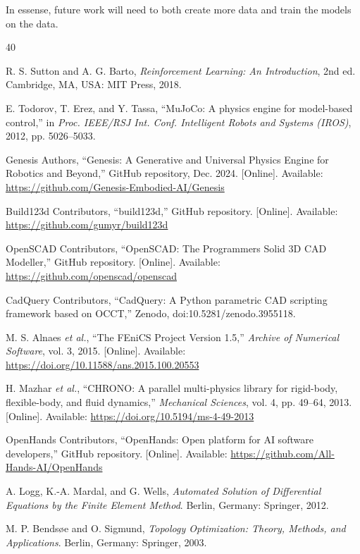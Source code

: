 \documentclass[conference]{IEEEtran}
\begin{document}
In essense, future work will need to both create more data and train the models on the data.
\begin{thebibliography}{40}

R. S. Sutton and A. G. Barto, \emph{Reinforcement Learning: An Introduction}, 2nd ed. Cambridge, MA, USA: MIT Press, 2018.

E. Todorov, T. Erez, and Y. Tassa, ``MuJoCo: A physics engine for model-based control,'' in \emph{Proc. IEEE/RSJ Int. Conf. Intelligent Robots and Systems (IROS)}, 2012, pp. 5026--5033.

Genesis Authors, ``Genesis: A Generative and Universal Physics Engine for Robotics and Beyond,'' GitHub repository, Dec. 2024. [Online]. Available: \url{https://github.com/Genesis-Embodied-AI/Genesis}

Build123d Contributors, ``build123d,'' GitHub repository. [Online]. Available: \url{https://github.com/gumyr/build123d}

OpenSCAD Contributors, ``OpenSCAD: The Programmers Solid 3D CAD Modeller,'' GitHub repository. [Online]. Available: \url{https://github.com/openscad/openscad}

CadQuery Contributors, ``CadQuery: A Python parametric CAD scripting framework based on OCCT,'' Zenodo, doi:10.5281/zenodo.3955118.

M. S. Alnaes \emph{et al.}, ``The FEniCS Project Version 1.5,'' \emph{Archive of Numerical Software}, vol. 3, 2015. [Online]. Available: \url{https://doi.org/10.11588/ans.2015.100.20553}

H. Mazhar \emph{et al.}, ``CHRONO: A parallel multi-physics library for rigid-body, flexible-body, and fluid dynamics,'' \emph{Mechanical Sciences}, vol. 4, pp. 49--64, 2013. [Online]. Available: \url{https://doi.org/10.5194/ms-4-49-2013}

OpenHands Contributors, ``OpenHands: Open platform for AI software developers,'' GitHub repository. [Online]. Available: \url{https://github.com/All-Hands-AI/OpenHands}

A. Logg, K.-A. Mardal, and G. Wells, \emph{Automated Solution of Differential Equations by the Finite Element Method}. Berlin, Germany: Springer, 2012.

M. P. Bendsøe and O. Sigmund, \emph{Topology Optimization: Theory, Methods, and Applications}. Berlin, Germany: Springer, 2003.


\end{thebibliography}
\end{document}

